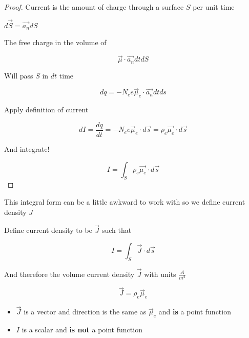 \documentclass[10pt]{article}
\begin{document}
\begin{proof}
Current is the amount of charge through a surface $ S $  per unit time

	$d\vec{S} = \vec{a_n} dS$

The free charge in the volume of 

\begin{equation}
	\vec{\mu} \cdot \vec{a_n} dt dS
\end{equation}

Will pass $ S $  in $ dt $  time

\begin{equation}
	dq = - N_e e \vec{\mu}_e \cdot \vec{a_n} dt ds
\end{equation}

Apply definition of current

\begin{equation}
	dI = \frac{dq}{dt} =- N_e e \vec{\mu}_e \cdot d\vec{s} = \rho_e \vec{\mu_e} \cdot d\vec{s} 
\end{equation}

And integrate!

\begin{equation}
	I = \int_S \rho_e \vec{\mu_e} \cdot d\vec{s}
\end{equation}
	
\end{proof}


This integral form can be a little awkward to work with so we define current density $ J $ 
\begin{definition}
Define current density to be $ \vec{J} $  such that

\begin{equation}
	I = \int_S \vec{J} \cdot d\vec{s}
	\label{eq:259:define_current_density}
\end{equation}

And therefore the volume current density $ \vec{J} $ with units $ \frac{A}{m^2}$

\begin{equation}
	\vec{J} = \rho_e \vec{\mu}_e
	\label{eq:259:define_J}
\end{equation}

\begin{itemize}
	\item $ \vec{J} $  is a vector and direction is the same as $ \vec{\mu}_e $ and \textbf{is}  a point function
	\item $ I $  is a scalar and \textbf{is not} a point function
\end{itemize}
\end{definition}
\end{document}
